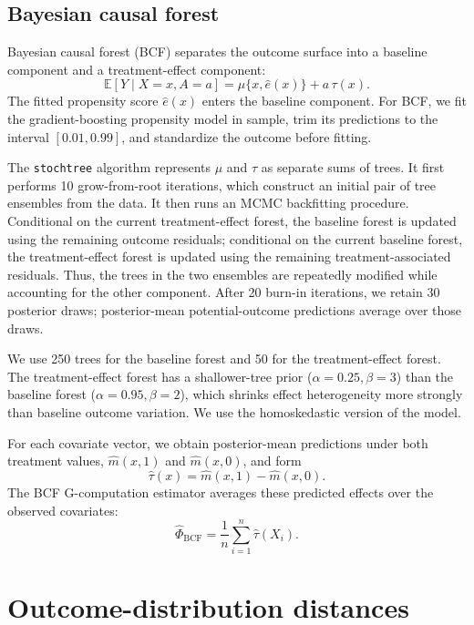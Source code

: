 \begin{landscape}
\subsection{Bayesian causal forest}

Bayesian causal forest (BCF) \cite{hahnBayesianRegressionTree2020} separates the outcome surface into a baseline component and a treatment-effect component:
\[
\mathbb E[Y\mid X=x,A=a]
=
\mu\{x,\widehat e(x)\}
+
a\,\tau(x).
\]
The fitted propensity score \(\widehat e(x)\) enters the baseline component. For BCF, we fit the gradient-boosting propensity model in sample, trim its predictions to the interval \([0.01,0.99]\), and standardize the outcome before fitting.

The \texttt{stochtree} algorithm represents \(\mu\) and \(\tau\) as separate sums of trees. It first performs 10 grow-from-root iterations, which construct an initial pair of tree ensembles from the data. It then runs an MCMC backfitting procedure. Conditional on the current treatment-effect forest, the baseline forest is updated using the remaining outcome residuals; conditional on the current baseline forest, the treatment-effect forest is updated using the remaining treatment-associated residuals. Thus, the trees in the two ensembles are repeatedly modified while accounting for the other component. After 20 burn-in iterations, we retain 30 posterior draws; posterior-mean potential-outcome predictions average over those draws.

We use 250 trees for the baseline forest and 50 for the treatment-effect forest. The treatment-effect forest has a shallower-tree prior (\(\alpha=0.25,\beta=3\)) than the baseline forest (\(\alpha=0.95,\beta=2\)), which shrinks effect heterogeneity more strongly than baseline outcome variation. We use the homoskedastic version of the model.

For each covariate vector, we obtain posterior-mean predictions under both treatment values, \(\widehat m(x,1)\) and \(\widehat m(x,0)\), and form
\[
\widehat\tau(x)=\widehat m(x,1)-\widehat m(x,0).
\]
The BCF G-computation estimator averages these predicted effects over the observed covariates:
\[
\widehat{\Phi}_{\mathrm{BCF}}
=
\frac{1}{n}
\sum_{i=1}^{n}
\widehat\tau(X_i).
\]

\clearpage
\section{Outcome-distribution distances}
\label{app:distances}


\end{landscape}
